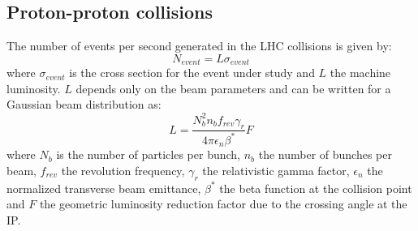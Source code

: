 \documentclass[a4paper, oneside]{book}
\begin{document}
				\subsection{Proton-proton collisions}
					\cite{LHC design}The number of events per second generated in the LHC collisions is given by:
					$$
					N_{event} = L\sigma_{event}
					$$
					where $\sigma_{event}$ is the cross section for the event under study and $L$ the machine luminosity. $L$ depends only on the beam parameters and can be written for a Gaussian beam distribution as: 
					$$
					L = \frac{N_b^2n_bf_{rev}\gamma_r}{4\pi\epsilon_n\beta^*}F
					$$
					where $N_b$ is the number of particles per bunch, $n_b$ the number of bunches per beam, $f_{rev}$ the revolution frequency, $\gamma_r$ the relativistic gamma factor, $\epsilon_n$ the normalized transverse beam emittance, $\beta^*$ the beta function at the collision point and $F$ the geometric luminosity reduction factor due to the crossing angle at the IP.
					
\end{document}
